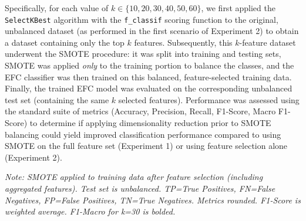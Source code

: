 \documentclass[12pt]{article}
\begin{document}
Specifically, for each value of $k \in \{10, 20, 30, 40, 50, 60\}$, we first applied the \texttt{SelectKBest} algorithm
with the \texttt{f\_classif} scoring function to the original, unbalanced dataset (as performed in the first scenario of
Experiment 2) to obtain a dataset containing only the top $k$ features. Subsequently, this $k$-feature dataset underwent
the SMOTE procedure: it was split into training and testing sets, SMOTE was applied \textit{only} to the training portion
to balance the classes, and the EFC classifier was then trained on this balanced, feature-selected training data. Finally,
the trained EFC model was evaluated on the corresponding unbalanced test set (containing the same $k$ selected features).
Performance was assessed using the standard suite of metrics (Accuracy, Precision, Recall, F1-Score, Macro F1-Score) to
determine if applying dimensionality reduction prior to SMOTE balancing could yield improved classification performance
compared to using SMOTE on the full feature set (Experiment 1) or using feature selection alone (Experiment 2).

\begin{table}[htbp]
  \centering
  \caption{EFC Performance: SMOTE with Feature Selection for Varying k (Experiment 3a).}
  \label{tab:exp3_smote_fs_results}
  \par\medskip
  \footnotesize
  \textit{Note: SMOTE applied to training data after feature selection (including aggregated features). Test set is unbalanced.
  TP=True Positives, FN=False Negatives, FP=False Positives, TN=True Negatives. Metrics rounded. F1-Score is weighted average.
  F1-Macro for k=30 is bolded.}
\end{table}
\end{document}
